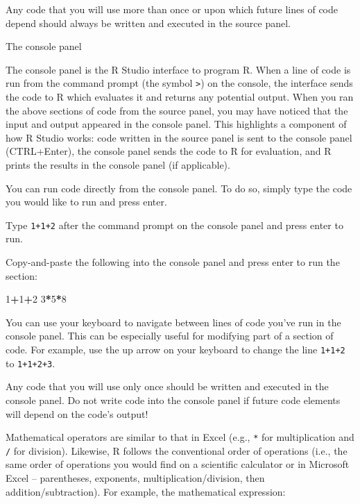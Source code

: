 \documentclass[]{article}
\newenvironment{Shaded}{\begin{snugshade}}{\end{snugshade}}
\newcommand{\DecValTok}[1]{\textcolor[rgb]{0.00,0.00,0.81}{#1}}
\newcommand{\OperatorTok}[1]{\textcolor[rgb]{0.81,0.36,0.00}{\textbf{#1}}}
\begin{document}
 Any code that you will use more than once or upon which future lines of
code depend should always be written and executed in the source panel.

The console panel

The console panel is the R Studio interface to program R. When a line of
code is run from the command prompt (the symbol \texttt{\textgreater{}})
on the console, the interface sends the code to R which evaluates it and
returns any potential output. When you ran the above sections of code
from the source panel, you may have noticed that the input and output
appeared in the console panel. This highlights a component of how R
Studio works: code written in the source panel is sent to the console
panel (CTRL+Enter), the console panel sends the code to R for
evaluation, and R prints the results in the console panel (if
applicable).

You can run code directly from the console panel. To do so, simply type
the code you would like to run and press enter.

 Type \texttt{1+1+2} after the command prompt on the console panel and
press enter to run.

 Copy-and-paste the following into the console panel and press enter to
run the section:

\begin{Shaded}
\begin{Highlighting}[]
\DecValTok{1}\OperatorTok{+}\DecValTok{1}\OperatorTok{+}\DecValTok{2}
\DecValTok{3}\OperatorTok{*}\DecValTok{5}\OperatorTok{*}\DecValTok{8}
\end{Highlighting}
\end{Shaded}

 You can use your keyboard to navigate between lines of code you've run
in the console panel. This can be especially useful for modifying part
of a section of code. For example, use the up arrow on your keyboard to
change the line \texttt{1+1+2} to \texttt{1+1+2+3}.

 Any code that you will use only once should be written and executed in
the console panel. Do not write code into the console panel if future
code elements will depend on the code's output!

 Mathematical operators are similar to that in Excel (e.g., \texttt{*}
for multiplication and \texttt{/} for division). Likewise, R follows the
conventional order of operations (i.e., the same order of operations you
would find on a scientific calculator or in Microsoft Excel --
parentheses, exponents, multiplication/division, then
addition/subtraction). For example, the mathematical expression:
\end{document}
